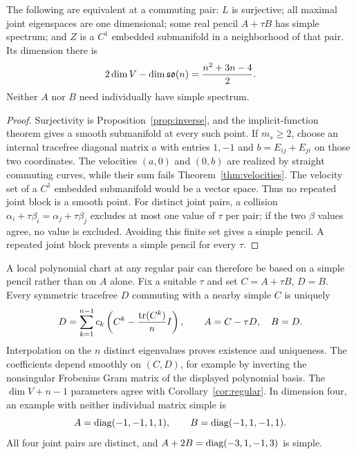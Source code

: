 \begin{corollary}\label{cor:regular}
The following are equivalent at a commuting pair: $L$ is surjective; all
maximal joint eigenspaces are one dimensional; some real pencil $A+\tau B$
has simple spectrum; and $Z$ is a $C^1$ embedded submanifold in a
neighborhood of that pair.  Its dimension there is
\[
 2\dim V-\dim\mathfrak{so}(n)=\frac{n^2+3n-4}{2}.
\]
Neither $A$ nor $B$ need individually have simple spectrum.
\end{corollary}

\begin{proof}
Surjectivity is Proposition~\ref{prop:inverse}, and the implicit-function
theorem gives a smooth submanifold at every such point.  If $m_s\geq2$,
choose an internal tracefree diagonal matrix $a$ with entries $1,-1$ and
$b=E_{ij}+E_{ji}$ on those two coordinates.  The velocities $(a,0)$ and
$(0,b)$ are realized by straight commuting curves, while their sum fails
Theorem~\ref{thm:velocities}.  The velocity set of a $C^1$ embedded
submanifold would be a vector space.  Thus no repeated joint block is a
smooth point.  For distinct joint pairs, a collision
$\alpha_i+\tau\beta_i=\alpha_j+\tau\beta_j$ excludes at most one value of
$\tau$ per pair; if the two $\beta$ values agree, no value is excluded.
Avoiding this finite set gives a simple pencil.  A repeated joint block
prevents a simple pencil for every $\tau$.
\end{proof}

\noindent
A local polynomial chart at any regular pair can therefore be based on a
simple pencil rather than on $A$ alone.  Fix a suitable $\tau$ and set
$C=A+\tau B$, $D=B$.  Every symmetric tracefree $D$ commuting with a
nearby simple $C$ is uniquely
\[
 D=\sum_{k=1}^{n-1}c_k\left(C^k-\frac{\operatorname{tr}(C^k)}{n}I\right),\qquad
 A=C-\tau D,\quad B=D.
\]
Interpolation on the $n$ distinct eigenvalues proves existence and
uniqueness.  The coefficients depend smoothly on $(C,D)$, for example by
inverting the nonsingular Frobenius Gram matrix of the displayed
polynomial basis.  The $\dim V+n-1$ parameters agree with
Corollary~\ref{cor:regular}.  In dimension four, an example with neither
individual matrix simple is
\[
 A=\operatorname{diag}(-1,-1,1,1),\qquad B=\operatorname{diag}(-1,1,-1,1).
\]
All four joint pairs are distinct, and $A+2B=\operatorname{diag}(-3,1,-1,3)$ is simple.

